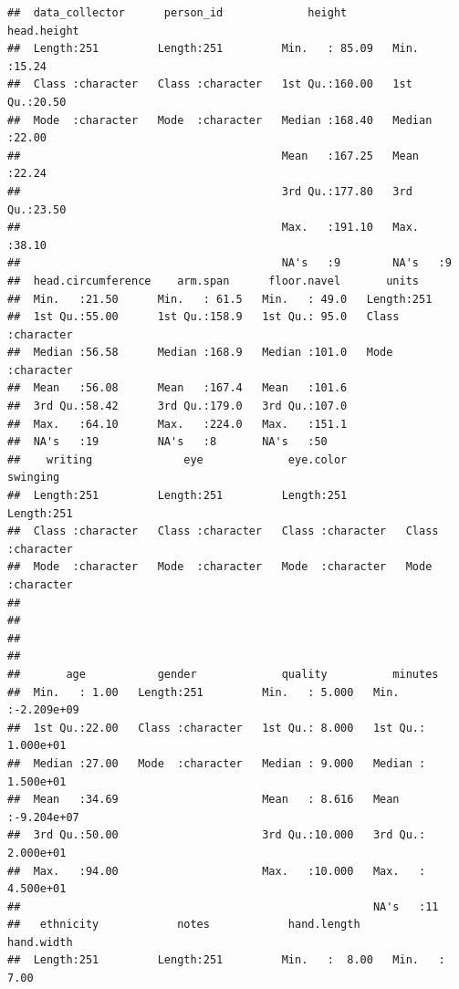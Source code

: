 \documentclass[]{article}
\begin{document}
\begin{verbatim}
##  data_collector      person_id             height        head.height   
##  Length:251         Length:251         Min.   : 85.09   Min.   :15.24  
##  Class :character   Class :character   1st Qu.:160.00   1st Qu.:20.50  
##  Mode  :character   Mode  :character   Median :168.40   Median :22.00  
##                                        Mean   :167.25   Mean   :22.24  
##                                        3rd Qu.:177.80   3rd Qu.:23.50  
##                                        Max.   :191.10   Max.   :38.10  
##                                        NA's   :9        NA's   :9      
##  head.circumference    arm.span      floor.navel       units          
##  Min.   :21.50      Min.   : 61.5   Min.   : 49.0   Length:251        
##  1st Qu.:55.00      1st Qu.:158.9   1st Qu.: 95.0   Class :character  
##  Median :56.58      Median :168.9   Median :101.0   Mode  :character  
##  Mean   :56.08      Mean   :167.4   Mean   :101.6                     
##  3rd Qu.:58.42      3rd Qu.:179.0   3rd Qu.:107.0                     
##  Max.   :64.10      Max.   :224.0   Max.   :151.1                     
##  NA's   :19         NA's   :8       NA's   :50                        
##    writing              eye             eye.color           swinging        
##  Length:251         Length:251         Length:251         Length:251        
##  Class :character   Class :character   Class :character   Class :character  
##  Mode  :character   Mode  :character   Mode  :character   Mode  :character  
##                                                                             
##                                                                             
##                                                                             
##                                                                             
##       age           gender             quality          minutes          
##  Min.   : 1.00   Length:251         Min.   : 5.000   Min.   :-2.209e+09  
##  1st Qu.:22.00   Class :character   1st Qu.: 8.000   1st Qu.: 1.000e+01  
##  Median :27.00   Mode  :character   Median : 9.000   Median : 1.500e+01  
##  Mean   :34.69                      Mean   : 8.616   Mean   :-9.204e+07  
##  3rd Qu.:50.00                      3rd Qu.:10.000   3rd Qu.: 2.000e+01  
##  Max.   :94.00                      Max.   :10.000   Max.   : 4.500e+01  
##                                                      NA's   :11          
##   ethnicity            notes            hand.length       hand.width   
##  Length:251         Length:251         Min.   :  8.00   Min.   : 7.00  

\end{verbatim}
\end{document}
